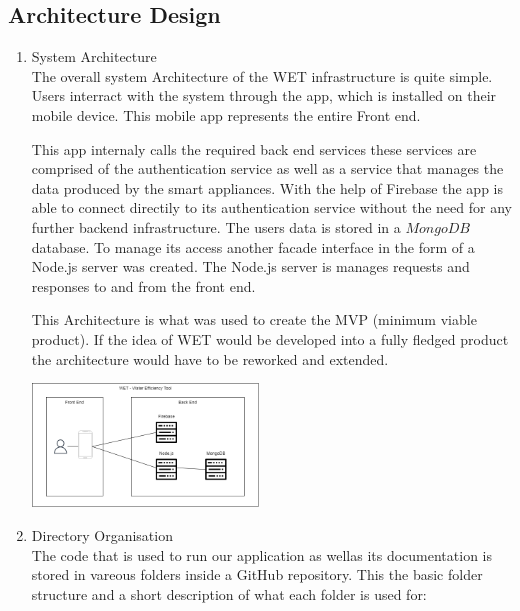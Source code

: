 \documentclass[10pt]{article}
\begin{document}
\begin{multicols*}{2}
\clearpage

\section{Architecture Design}

\begin{enumerate}
  \item {System Architecture} \\
  The overall system Architecture of the WET infrastructure is quite simple.
  Users interract with the system through the app, which is installed on their mobile device. This mobile app represents the entire Front end.

  This app internaly calls the required back end services these services are comprised of the authentication service as well as a service that manages the data produced by the smart appliances.
  With the help of Firebase the app is able to connect directily to its authentication service without the need for any further backend infrastructure.
  The users data is stored in a $MongoDB$ database. To manage its access another facade interface in the form of a Node.js server was created. The Node.js server is manages requests and responses to and from the front end.

  This Architecture is what was used to create the MVP (minimum viable product). If the idea of WET would be developed into a fully fledged product the architecture would have to be reworked and extended.

  \begin{center}
    \includegraphics[max width=6cm]{architecture}
  \end{center}
  
  \item {Directory Organisation} \\
  The code that is used to run our application as wellas its documentation is stored in vareous folders inside a GitHub repository.
  This the basic folder structure and a short description of what each folder is used for:


\end{enumerate}
\end{multicols*}
\end{document}
